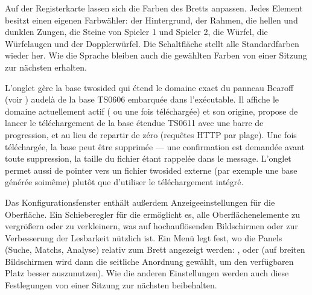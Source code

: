 \documentclass[letterpaper,10pt,german]{sphinxmanual}
\begin{document}
\sphinxAtStartPar
Auf der Registerkarte  lassen sich die Farben des Bretts anpassen. Jedes Element besitzt einen eigenen Farbwähler: der Hintergrund, der Rahmen, die hellen und dunklen Zungen, die Steine von Spieler 1 und Spieler 2, die Würfel, die Würfelaugen und der Dopplerwürfel. Die Schaltfläche  stellt alle Standardfarben wieder her. Wie die Sprache bleiben auch die gewählten Farben von einer Sitzung zur nächsten erhalten.

\sphinxAtStartPar
L’onglet  gère la base two\sphinxhyphen{}sided qui étend le domaine exact du
panneau Bearoff (voir {\hyperref[\detokenize{manuel:panneau-epc}]{}}) au\sphinxhyphen{}delà de la base TS\sphinxhyphen{}06\sphinxhyphen{}06
embarquée dans l’exécutable. Il affiche le domaine actuellement actif
( ou  une fois téléchargée) et son origine, propose de
lancer le téléchargement de la base étendue TS\sphinxhyphen{}06\sphinxhyphen{}11 avec une barre de
progression, et  au
lieu de repartir de zéro (requêtes HTTP par plage). Une fois téléchargée, la
base peut être supprimée — une confirmation est demandée avant toute
suppression, la taille du fichier étant rappelée dans le message. L’onglet
permet aussi de pointer vers un fichier  two\sphinxhyphen{}sided externe (par exemple
une base générée soi\sphinxhyphen{}même) plutôt que d’utiliser le téléchargement intégré.

\sphinxAtStartPar
Das Konfigurationsfenster enthält außerdem Anzeigeeinstellungen für die Oberfläche. Ein Schieberegler für die  ermöglicht es, alle Oberflächenelemente zu vergrößern oder zu verkleinern, was auf hochauflösenden Bildschirmen oder zur Verbesserung der Lesbarkeit nützlich ist. Ein Menü  legt fest, wo die Panels (Suche, Matchs, Analyse) relativ zum Brett angezeigt werden: ,  oder  (auf breiten Bildschirmen wird dann die seitliche Anordnung gewählt, um den verfügbaren Platz besser auszunutzen). Wie die anderen Einstellungen werden auch diese Festlegungen von einer Sitzung zur nächsten beibehalten.
\end{document}
